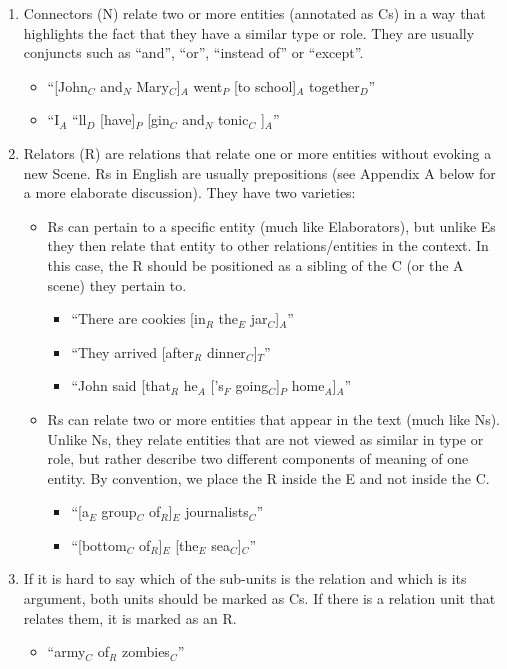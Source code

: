 \documentclass[11pt]{article}
\begin{document}
\begin{enumerate}
\item
Connectors (N) relate two or more entities (annotated as Cs) in a way that highlights the fact that they have a similar type or role. They are usually conjuncts such as ``and'', ``or'', ``instead of'' or ``except''.

\begin{itemize}
\item
``[John$_C$ and$_N$ Mary$_C$]$_A$ went$_P$ [to school]$_A$ together$_D$''
\item
``I$_A$ ``ll$_D$ [have]$_P$ [gin$_C$ and$_N$ tonic$_C$ ]$_A$''
\end{itemize}

\item
Relators (R) are relations that relate one or more entities without evoking a new Scene. Rs in English are usually prepositions (see Appendix A below for a more elaborate discussion). They have two varieties:

\begin{itemize}
\item
Rs can pertain to a specific entity (much like Elaborators), but unlike Es they then relate that entity to other relations/entities in the context. In this case, the R should be positioned as a sibling of the C (or the A scene) they pertain to.

\begin{itemize}
\item
``There are cookies [in$_R$ the$_E$ jar$_C$]$_A$''
\item
``They arrived [after$_R$ dinner$_C$]$_T$''
\item
``John said [that$_R$ he$_A$ ['s$_F$ going$_C$]$_P$ home$_A$]$_A$''
\end{itemize}

\item
Rs can relate two or more entities that appear in the text (much like Ns). Unlike Ns, they relate entities that are not viewed as similar in type or role, but rather describe two different components of meaning of one entity. By convention, we place the R inside the E and not inside the C.
\begin{itemize}
\item ``[a$_E$ group$_C$ of$_R$]$_E$ journalists$_C$''
\item ``[bottom$_C$ of$_R$]$_E$ [the$_E$ sea$_C$]$_C$''
\end{itemize}

\end{itemize}

\item
If it is hard to say which of the sub-units is the relation and which is its argument, both units should be marked as Cs. If there is a relation unit that relates them, it is marked as an R.
\begin{itemize}
\item
``army$_C$ of$_R$ zombies$_C$''
\end{itemize}


\end{enumerate}
\end{document}
